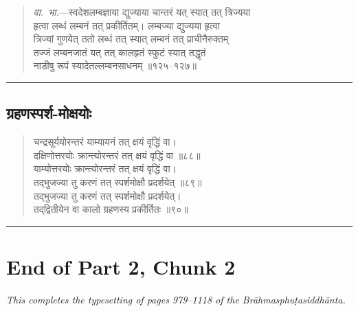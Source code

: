 \documentclass[11pt,a4paper]{article}
\newcommand{\longline}{\noindent\rule{\textwidth}{0.4pt}}
\newcommand{\dev}[1]{{\devanagarifont #1}}
\newenvironment{shloka}{%
  \begin{quote}
  \small
  \setlength{\leftmargin}{2em}
  \devanagarifont
}{\end{quote}}
\newenvironment{vyakhya}{%
  \begin{quote}
  \small
  \setlength{\leftmargin}{1em}
  \devanagarifont
}{\end{quote}}
\newcommand{\skt}[1]{{\devanagarifont #1}}
\begin{document}
\begin{vyakhya}
\textit{वा.~भा.}—\skt{स्वदेशलम्बज्ञाया द्युज्याया चान्तरं यत् स्यात् तत् त्रिज्यया}\\
\skt{हृत्वा लब्धं लम्बनं तत् प्रकीर्तितम्। लम्बज्या द्युज्यया हृत्वा}\\
\skt{त्रिज्यां गुणयेत् ततो लब्धं तत् स्यात् लम्बनं तत् प्राचीनैरुक्तम्}\\
\skt{तज्जं लम्बनजातं यत् तत् कालहृतं स्फुटं स्यात् तद्धृतं}\\
\skt{नाडीषु रूपं स्यादेतल्लम्बनसाधनम् ॥१२५--१२७॥}
\end{vyakhya}

\longline

\subsection{\dev{ग्रहणस्पर्श-मोक्षयोः}}

\begin{shloka}
\skt{चन्द्रसूर्ययोरन्तरं याम्यायनं तत् क्षयं वृद्धिं वा।}\\
\skt{दक्षिणोत्तरयोः क्रान्त्योरन्तरं तत् क्षयं वृद्धिं वा ॥८८॥}\\[0.3em]
\skt{याम्योत्तरयोः क्रान्त्योरन्तरं तत् क्षयं वृद्धिं वा।}\\
\skt{तद्‌भुजज्या तु करणं तत् स्पर्शमोक्षौ प्रदर्शयेत् ॥८९॥}\\[0.3em]
\skt{तद्‌भुजज्या तु करणं तत् स्पर्शमोक्षौ प्रदर्शयेत्।}\\
\skt{तद्‌द्वितीयेन वा कालो ग्रहणस्य प्रकीर्तितः ॥९०॥}
\end{shloka}

\longline

\section*{End of Part 2, Chunk 2}

\begin{center}
\textit{This completes the typesetting of pages 979--1118 of the Brāhmasphuṭasiddhānta.}
\end{center}
\end{document}
